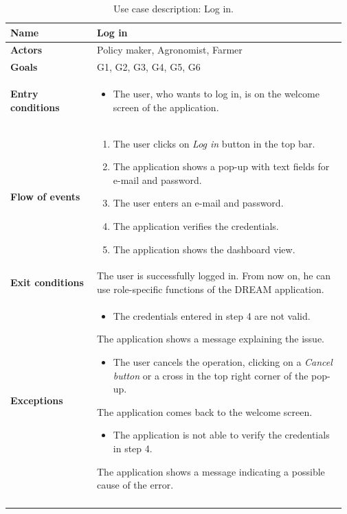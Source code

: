 \begin{longtable}{@{}p{0.25\linewidth} p{0.72\linewidth}@{}}
\toprule
	\textbf{Name}               & Log in\\
	\midrule
	\textbf{Actors}             & Policy maker, Agronomist, Farmer\\
	\midrule
	\textbf{Goals}              & G1, G2, G3, G4, G5, G6 \\
	\midrule
	
	\textbf{Entry conditions}   & \begin{itemize}[leftmargin=.4cm,noitemsep,topsep=0pt,before=\vspace{-3mm},after=\vspace{-4mm}]
	    \item The user, who wants to log in, is  on the welcome screen of the application.
	\end{itemize}\\
	\midrule
	
	\textbf{Flow of events}     & \begin{enumerate}[leftmargin=.4cm,noitemsep,topsep=0pt,before=\vspace{-3mm},after=\vspace{-4mm}]
	    \item The user clicks on \textit{Log in} button in the top bar.
	    \item The application shows a pop-up with text fields for e-mail and password.
	    \item The user enters an e-mail and password.
	    \item The application verifies the credentials.
	    \item The application shows the dashboard view.
	\end{enumerate}\\
	\midrule
	\textbf{Exit conditions}    & The user is successfully logged in. From now on, he can use role-specific functions of the DREAM application. \\
	\midrule
	
	\textbf{Exceptions}         & \begin{itemize}[leftmargin=.4cm,noitemsep,topsep=0pt,before=\vspace{-3mm}]
	   \item The credentials entered in step 4 are not valid.
	\end{itemize}
	The application shows a message explaining the issue.
    \begin{itemize}[leftmargin=.4cm,noitemsep,topsep=0pt]
	   \item The user cancels the operation, clicking on a \textit{Cancel button} or a cross in the top right corner of the pop-up.
	\end{itemize}
	The application comes back to the welcome screen.
    \begin{itemize}[leftmargin=.4cm,noitemsep,topsep=0pt]
	   \item The application is not able to verify the credentials in step 4.
	\end{itemize}
	The application shows a message indicating a possible cause of the error.
	\\\bottomrule
	\caption{Use case description: Log in.} 
\end{longtable}

